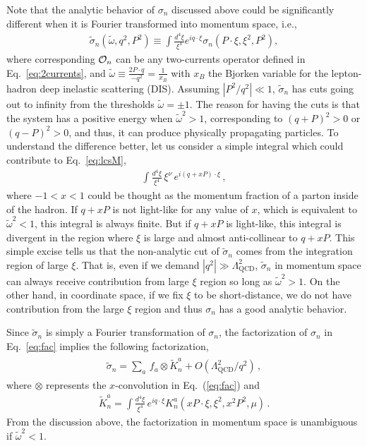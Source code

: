 \documentclass[twocolumn,aps,prl,superscriptaddress,nofootinbib,showpacs]{revtex4-1}
\begin{document}
Note that the analytic behavior of $\sigma_n$ discussed above could be significantly different when it is Fourier transformed into momentum space, i.e.,
\begin{align}\label{eq:lcsM}
\widetilde{\sigma}_{n}(\widetilde{\omega},q^2,P^2)\equiv
\int \frac{d^4\xi}{\xi^4} e^{iq\cdot \xi} {\sigma}_{n}(P\cdot\xi,\xi^2,P^2),
\end{align}
where corresponding ${\cal O}_n$ can be any two-currents operator defined in Eq.~\eqref{eq:2currents}, and $\widetilde{\omega}\equiv \frac{2P\cdot q}{-q^2}=\frac{1}{x_B}$ with $x_B$ the Bjorken variable for the lepton-hadron deep inelastic scattering (DIS). Assuming $|P^2/q^2|\ll1$, $\widetilde{\sigma}_{n}$ has cuts going out to infinity from the thresholds $\widetilde{\omega}=\pm1$.  The reason for having the cuts is that the system has a positive energy when $\widetilde{\omega}^2>1$, corresponding to $(q+P)^2>0$ or $(q-P)^2>0$, and thus, it can produce physically propagating particles.
To understand the difference better, let us consider a simple integral which could contribute to Eq.~\eqref{eq:lcsM},
\begin{align}
\int \frac{d^4\xi}{\xi^4}\,\xi^{\nu}\,e^{i (q+ xP)\cdot \xi}\,,
\end{align}
where $-1<x<1$ could be thought as the momentum fraction of a parton inside of the hadron. If $q+ xP$ is not light-like for any value of $x$, which is equivalent to $\widetilde{\omega}^2<1$, this integral is always finite. But if $q+ xP$ is light-like, this integral is divergent in the region where $\xi$ is large and almost anti-collinear to $q+ xP$. This simple excise tells us that the non-analytic cut of $\widetilde{\sigma}_{n}$ comes from the integration region of large $\xi$. That is, even if we demand $|q^2|\gg \Lambda_{\text{QCD}}^2$, $\widetilde{\sigma}_{n}$ in momentum space can always receive contribution from large $\xi$ region so long as $\widetilde{\omega}^2>1$.  On the other hand,
in coordinate space, if we fix $\xi$ to be short-distance, we do not have contribution from the large $\xi$ region and thus ${\sigma}_{n}$ has a good analytic behavior.

Since $\widetilde{\sigma}_{n}$ is simply a Fourier transformation of ${\sigma}_{n}$, the factorization of ${\sigma}_{n}$ in Eq.~\eqref{eq:fac} implies the following factorization,
 \begin{align}\label{eq:facM}
\begin{split}
\widetilde{\sigma}_{n}=\sum_{a}\, f_{a} \otimes \widetilde{K}_{{n}}^{a} +O(\Lambda_{\text{QCD}}^2/q^2)\, ,
 \end{split}
\end{align}
where $\otimes$ represents the $x$-convolution in Eq.~(\ref{eq:fac}) and
\begin{align}\label{eq:Km}
\widetilde{K}_{n}^{a}=\int \frac{d^4\xi}{\xi^4}\,e^{i q\cdot \xi} K_{n}^{a}(x P\cdot\xi,\xi^2,x^2P^2,\mu)\,.
\end{align}
From the discussion above, the factorization in momentum space is unambiguous if $\widetilde{\omega}^2<1$.
\end{document}
